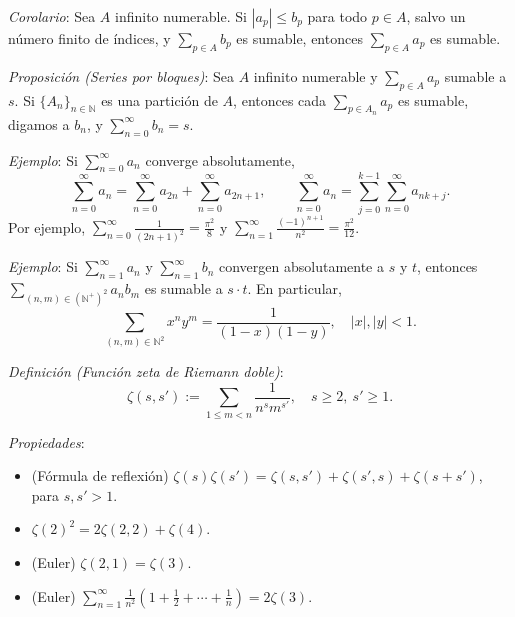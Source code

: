 \documentclass{beamer}
\begin{document}
  \begin{frame}
    \textit{Corolario}: Sea $A$ infinito numerable. Si $|a_p| \leq b_p$ para todo
    $p \in A$, salvo un número finito de índices, y $\sum_{p \in A} b_p$ es sumable,
    entonces $\sum_{p \in A} a_p$ es sumable.
    \newline\newline
    \pause

    \textit{Proposición (Series por bloques)}: Sea $A$ infinito numerable y
    $\sum_{p \in A} a_p$ sumable a $s$. Si $\{A_n\}_{n \in \mathbb{N}}$ es una
    partición de $A$, entonces cada $\sum_{p \in A_n} a_p$ es sumable, digamos a
    $b_n$, y $\sum_{n=0}^{\infty} b_n = s$.
    \newline\newline
    \pause

    \textit{Ejemplo}: Si $\sum_{n=0}^{\infty} a_n$ converge absolutamente,
    \[
      \sum_{n=0}^{\infty} a_n = \sum_{n=0}^{\infty} a_{2n} + \sum_{n=0}^{\infty} a_{2n+1},
      \qquad
      \sum_{n=0}^{\infty} a_n = \sum_{j=0}^{k-1} \sum_{n=0}^{\infty} a_{nk+j}.
    \]
    \pause
    Por ejemplo, $\sum_{n=0}^{\infty} \frac{1}{(2n+1)^2} = \frac{\pi^2}{8}$ y
    $\sum_{n=1}^{\infty} \frac{(-1)^{n+1}}{n^2} = \frac{\pi^2}{12}$.
  \end{frame}

  \begin{frame}
    \textit{Ejemplo}: Si $\sum_{n=1}^{\infty} a_n$ y $\sum_{n=1}^{\infty} b_n$
    convergen absolutamente a $s$ y $t$, entonces
    $\sum_{(n,m) \in (\mathbb{N}^+)^2} a_n b_m$ es sumable a $s \cdot t$.
    En particular,
    \[
      \sum_{(n,m) \in \mathbb{N}^2} x^n y^m = \frac{1}{(1-x)(1-y)}, \quad |x|, |y| < 1.
    \]
    \pause

    \textit{Definición (Función zeta de Riemann doble)}:
    \[
      \zeta(s, s') := \sum_{1 \leq m < n} \frac{1}{n^s m^{s'}}, \quad s \geq 2,\ s' \geq 1.
    \]
    \pause

    \textit{Propiedades}:
    \begin{itemize}[<+->]
      \item (Fórmula de reflexión)
        $\zeta(s)\zeta(s') = \zeta(s, s') + \zeta(s', s) + \zeta(s + s')$, para $s, s' > 1$.
      \item $\zeta(2)^2 = 2\zeta(2,2) + \zeta(4)$.
      \item (Euler) $\zeta(2,1) = \zeta(3)$.
      \item (Euler) $\sum_{n=1}^{\infty} \frac{1}{n^2}\left(1 + \frac{1}{2} + \cdots + \frac{1}{n}\right) = 2\zeta(3)$.
    \end{itemize}
  \end{frame}
\end{document}
